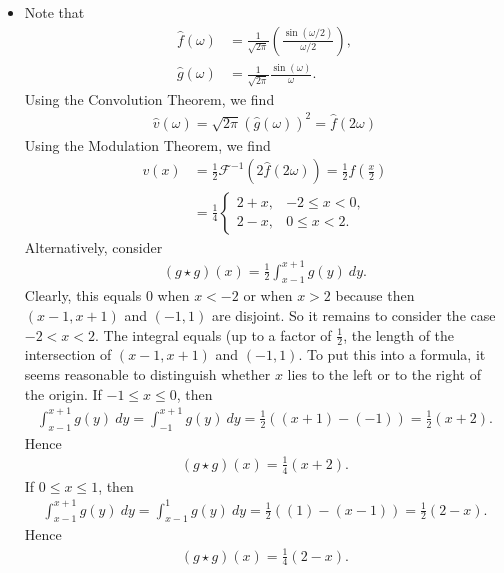 \documentclass[11pt]{article}
\begin{document}
\begin{solution}
\begin{itemize}
        
        \item 
        Note that
        \begin{align*}
            \hat{f}(\omega) &= \frac{1}{\sqrt{2 \pi}} \left(\frac{\sin(\omega / 2)}{\omega / 2}\right),
            \\
            \hat{g}(\omega) &= \frac{1}{\sqrt{2 \pi}} \frac{\sin(\omega)}{\omega}.
        \end{align*}
        Using the Convolution Theorem, we find
        \begin{align*}
            \hat{v}(\omega) = \sqrt{2 \pi}(\hat g (\omega))^2 = \hat f(2 \omega)
        \end{align*}
        Using the Modulation Theorem, we find
        \begin{align*}
            v(x) &= \frac 1 2 \mathcal{F}^{-1}(2 \hat f(2 \omega)) = \frac 1 2 f(\frac x 2)\\
                &= \frac 1 4 \begin{cases}
                    2 + x,& -2 \leq x < 0,\\
                    2 - x,& 0 \leq x < 2.
                \end{cases}
        \end{align*}
        Alternatively, consider 
        \begin{align*}
            ( g \star g )(x) = \frac 1 2 \int_{x-1}^{x+1} g(y) \ dy.
        \end{align*}
        Clearly, this equals $0$ when $x < -2$ or when $x > 2$ because then $(x-1,x+1)$ and $(-1,1)$ are disjoint. 
        So it remains to consider the case $-2 < x < 2$.
        The integral equals (up to a factor of $\tfrac 1 2$, the length of the intersection of $(x-1,x+1)$ and $(-1,1)$. 
        To put this into a formula, it seems reasonable to distinguish whether $x$ lies to the left or to the right of the origin.
        If $-1 \leq x \leq 0$, then 
        \begin{align*}
            \int_{x-1}^{x+1} g(y) \ dy = \int_{-1}^{x+1} g(y) \ dy = \frac 1 2 ( (x+1) - (-1) ) = \frac 1 2 ( x + 2 ).
        \end{align*}
        Hence 
        \begin{align*}
            ( g \star g )(x) = \frac 1 4 ( x + 2 ).
        \end{align*}
        If $0 \leq x \leq 1$, then 
        \begin{align*}
            \int_{x-1}^{x+1} g(y) \ dy = \int_{x-1}^{1} g(y) \ dy = \frac 1 2 ( (1) - (x-1) ) = \frac 1 2 ( 2 - x ).
        \end{align*}
        Hence 
        \begin{align*}
            ( g \star g )(x) = \frac 1 4 ( 2 - x ).
        \end{align*}
        

\end{itemize}
\end{solution}
\end{document}
